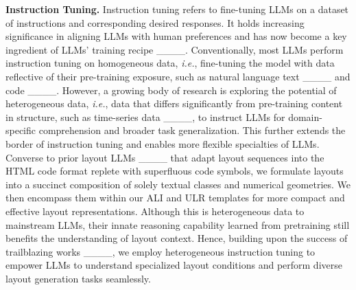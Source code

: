 \textbf{Instruction Tuning.} Instruction tuning refers to fine-tuning LLMs on a dataset of instructions and corresponding desired responses. It holds increasing significance in aligning LLMs with human preferences and has now become a key ingredient of LLMs' training recipe ____. Conventionally, most LLMs perform instruction tuning on homogeneous data, \emph{i.e.}, fine-tuning the model with data reflective of their pre-training exposure, such as natural language text ____ and code ____. However, a growing body of research is exploring the potential of heterogeneous data, \emph{i.e.}, data that differs significantly from pre-training content in structure, such as time-series data ____, to instruct LLMs for domain-specific comprehension and broader task generalization. This further extends the border of instruction tuning and enables more flexible specialties of LLMs. Converse to prior layout LLMs ____ that adapt layout sequences into the HTML code format replete with superfluous code symbols, we formulate layouts into a succinct composition of solely textual classes and numerical geometries. We then encompass them within our ALI and ULR templates for more compact and effective layout representations. Although this is heterogeneous data to mainstream LLMs, their innate reasoning capability learned from pretraining still benefits the understanding of layout context. Hence, building upon the success of trailblazing works ____, we employ heterogeneous instruction tuning to empower LLMs to understand specialized layout conditions and perform diverse layout generation tasks seamlessly.